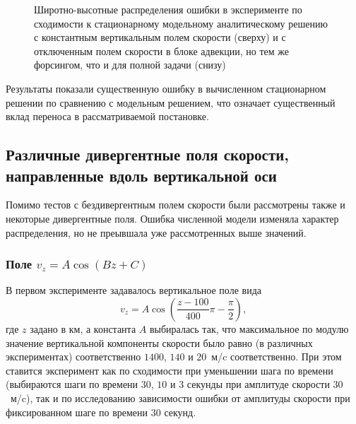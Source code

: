 \documentclass[14pt, a4paper]{extarticle}
\begin{document}
\begin{figure}[H]


\caption{Широтно-высотные распределения ошибки в эксперименте по сходимости к стационарному модельному аналитическому решению с константным вертикальным полем скорости (сверху) и с отключенным полем скорости в блоке адвекции, но тем же форсингом, что и для полной задачи (снизу)}
\end{figure}

Результаты показали существенную ошибку в вычисленном стационарном решении по сравнению с модельным решением, что означает существенный вклад переноса в рассматриваемой постановке.

\subsection{Различные дивергентные поля скорости, направленные вдоль вертикальной оси}

Помимо тестов с бездивергентным полем скорости были рассмотрены также и некоторые дивергентные поля. Ошибка численной модели изменяла характер распределения, но не преывшала уже рассмотренных выше значений. 

\subsubsection{Поле $v_z = A\cos(Bz+C)$}

В первом эксперименте задавалось вертикальное поле вида 
\begin{equation}\label{cosfield}
v_z = A\cos\left(\dfrac{z-100}{400}\pi - \dfrac{\pi}{2}\right),
\end{equation}
где $z$ задано в км, а константа $A$ выбиралась так, что максимальное по модулю значение вертикальной компоненты скорости было равно (в различных экспериментах) соответственно $1400$, $140$ и $20$~м/c соответственно. При этом ставится эксперимент как по сходимости при уменьшении шага по времени (выбираются шаги по времени $30$, $10$ и $3$ секунды при амплитуде скорости $30$~м/c), так и по исследованию зависимости ошибки от амплитуды скорости при фиксированном шаге по времени $30$ секунд. 
\end{document}
